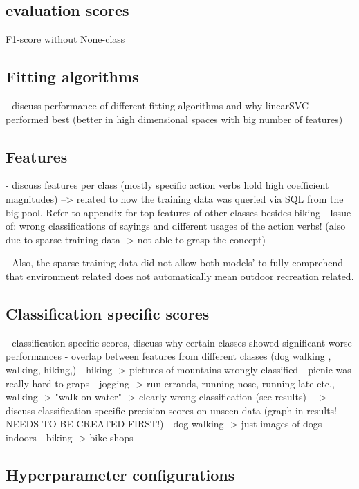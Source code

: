 \subsection{evaluation scores}
F1-score without None-class

\subsection{Fitting algorithms}
- discuss performance of different fitting algorithms and why linearSVC performed best (better in high dimensional spaces with big number of features)

\subsection{Features} \label{discussion_model_features}
- discuss features per class (mostly specific action verbs hold high coefficient magnitudes) --> related to how the training data was queried via SQL from the big pool. Refer to appendix for top features of other classes besides biking
- Issue of: wrong classifications of sayings and different usages of the action verbs! (also due to sparse training data -> not able to grasp the concept)

- Also, the sparse training data did not allow both models' to fully comprehend that environment related does not automatically mean outdoor recreation related.

\subsection{Classification specific scores}\label{discussion_class_specific_perform}
- classification specific scores, discuss why certain classes showed significant worse performances
- overlap between features from different classes (dog walking , walking, hiking,) 
- hiking -> pictures of mountains wrongly classified
- picnic was really hard to graps
- jogging -> run errands, running nose, running late etc., 
- walking -> "walk on water" -> clearly wrong classification (see results)
---> discuss classification specific precision scores on unseen data (graph in results! NEEDS TO BE CREATED FIRST!)
- dog walking -> just images of dogs indoors
- biking -> bike shops 

\subsection{Hyperparameter configurations}


